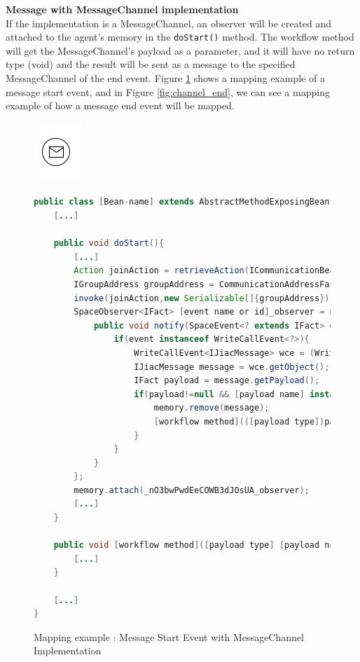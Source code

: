 \newpage
\textbf{Message with MessageChannel implementation}\\
If the implementation is a MessageChannel, an observer will be created and attached to the agent's memory in the \verb|doStart()| method.
The workflow method will get the MessageChannel's payload as a parameter, and it will have no return type (void) and the result will be sent as a message to the specified MessageChannel of the end event. Figure \ref{fig:channel_start} shows a mapping example of a message start event, and in Figure \ref{fig:channel_end}, we can see a mapping example of how a message end event will be mapped.
\begin{figure}[h]
\begin{minipage}[c]{0.28\textwidth}
\includegraphics{images/mapping/message_start.png}
\end{minipage}
\begin{minipage}[c]{0.72\textwidth}
\begin{lstlisting}[language = Java]
public class [Bean-name] extends AbstractMethodExposingBean{
	[...]
	
	public void doStart(){
		[...]
		Action joinAction = retrieveAction(ICommunicationBean.ACTION_JOIN_GROUP);
		IGroupAddress groupAddress = CommunicationAddressFactory.createGroupAddress([channel]);
		invoke(joinAction,new Serializable[]{groupAddress});
		SpaceObserver<IFact> [event name or id]_observer = new SpaceObserver<IFact>(){
			public void notify(SpaceEvent<? extends IFact> event) { 
				if(event instanceof WriteCallEvent<?>){ 
					WriteCallEvent<IJiacMessage> wce = (WriteCallEvent<IJiacMessage>) event;
					IJiacMessage message = wce.getObject();
					IFact payload = message.getPayload();
					if(payload!=null && [payload name] instanceof [payload type]&& message.getHeader(IJiacMessage.Header.SEND_TO).equals([channel]){
						memory.remove(message);
						[workflow method](([payload type])payload);
					}
				}
			}
		};
		memory.attach(_nO3bwPwdEeCOWB3dJOsUA_observer);
		[...]
	}
	
	public void [workflow method]([payload type] [payload name]){
		[...]
	}
	
	[...]
}
\end{lstlisting}
\end{minipage}
\caption{Mapping example : Message Start Event with MessageChannel Implementation}%
\label{fig:channel_start}
\end{figure}



